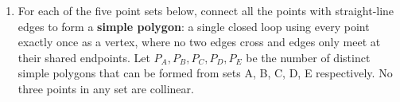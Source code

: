 \documentclass[a4paper,12pt]{article}
\newcommand{\hchoices}[5]{%
  \par\vspace{5pt}%
  \noindent\hspace{2em}%
  \textbf{(A)}~#1\hfill%
  \textbf{(B)}~#2\hfill%
  \textbf{(C)}~#3\hfill%
  \textbf{(D)}~#4\hfill%
  \textbf{(E)}~#5\par%
  \vspace{4pt}%
}
\begin{document}
\begin{enumerate}[label=\textbf{Q\arabic*.},
                  itemsep=3.5ex,
                  leftmargin=3.8em,
                  parsep=0pt,
                  start=13]
\hchoices{12}{14}{16}{18}{20}

\item For each of the five point sets below, connect all the points with
straight-line edges to form a \textbf{simple polygon}: a single closed loop
using every point exactly once as a vertex, where no two edges cross and edges
only meet at their shared endpoints. Let $P_A, P_B, P_C, P_D, P_E$ be the
number of distinct simple polygons that can be formed from sets A, B, C, D, E
respectively. No three points in any set are collinear.

\bigskip
\begin{center}
\begin{minipage}[b]{0.28\linewidth}\centering
  \par{}
\end{minipage}
\hfill
\begin{minipage}[b]{0.22\linewidth}\centering
  \par{}
\end{minipage}
\hfill
\begin{minipage}[b]{0.28\linewidth}\centering
  \par{}
\end{minipage}

\bigskip


\end{center}
\end{enumerate}
\end{document}
